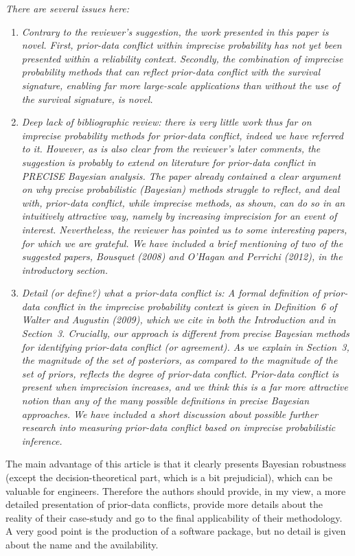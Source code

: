 \documentclass[Journal,SectionNumbers,SingleSpace,InsideFigs]{ascelike}
\begin{document}
\smallskip

\emph{There are several issues here:}
\begin{enumerate}
\item \emph{Contrary to the reviewer's suggestion, the work presented in this paper is novel.
First, prior-data conflict within imprecise probability has not yet been presented within a reliability context.
Secondly, the combination of imprecise probability methods that can reflect prior-data conflict with the survival signature,
enabling far more large-scale applications than without the use of the survival signature, is novel.}
\item \emph{Deep lack of bibliographic review:
there is very little work thus far on imprecise probability methods for prior-data conflict, indeed we have referred to it.
However, as is also clear from the reviewer's later comments,
the suggestion is probably to extend on literature for prior-data conflict in PRECISE Bayesian analysis.
The paper already contained a clear argument on why precise probabilistic (Bayesian) methods struggle to reflect,
and deal with, prior-data conflict, while imprecise methods, as shown, can do so in an intuitively attractive way,
namely by increasing imprecision for an event of interest.
Nevertheless, the reviewer has pointed us to some interesting papers, for which we are grateful.
We have included a brief mentioning of two of the suggested papers,
Bousquet (2008) and O'Hagan and Perrichi (2012), in the introductory section.}
\item \emph{Detail (or define?) what a prior-data conflict is:
A formal definition of prior-data conflict in the imprecise probability context is given in Definition~6
of Walter and Augustin (2009), which we cite in both the Introduction and in Section~3.
Crucially, our approach is different from precise Bayesian methods for identifying prior-data conflict (or agreement).
As we explain in Section~3,
the magnitude of the set of posteriors, as compared to the magnitude of the set of priors,
reflects the degree of prior-data conflict.
Prior-data conflict is present when imprecision increases,
and we think this is a far more attractive notion than any of the many possible definitions in precise Bayesian approaches.
We have included a short discussion about possible further research into measuring prior-data conflict
based on imprecise probabilistic inference.}
\end{enumerate}

The main advantage of this article is that it clearly presents Bayesian robustness (except the decision-theoretical part,
which is a bit prejudicial), which can be valuable for engineers.
Therefore the authors should provide, in my view, a more detailed presentation of prior-data conflicts,
provide more details about the reality of their case-study and go to the final applicability of their methodology.
A very good point is the production of a software package, but no detail is given about the name and the availability.
\end{document}
